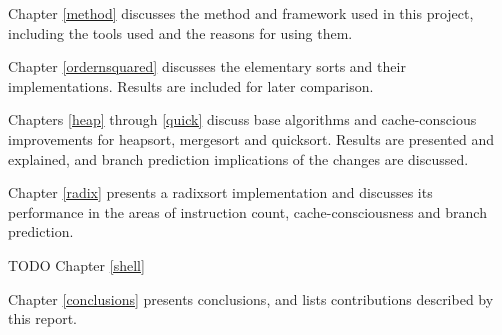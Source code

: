 Chapter \ref{method}  discusses the method and framework used in this project, including the
tools used and the reasons for using them.

Chapter \ref{ordernsquared}  discusses the elementary sorts and their implementations. Results are
included for later comparison.

Chapters \ref{heap} through \ref{quick} discuss base algorithms and cache-conscious improvements
for heapsort, mergesort and quicksort. Results are presented and explained, and
branch prediction implications of the changes are discussed.

Chapter \ref{radix} presents a radixsort implementation and discusses its performance in
the areas of instruction count, cache-consciousness and branch prediction.

TODO Chapter \ref{shell}

Chapter \ref{conclusions} presents conclusions, and lists contributions
described by this report.
